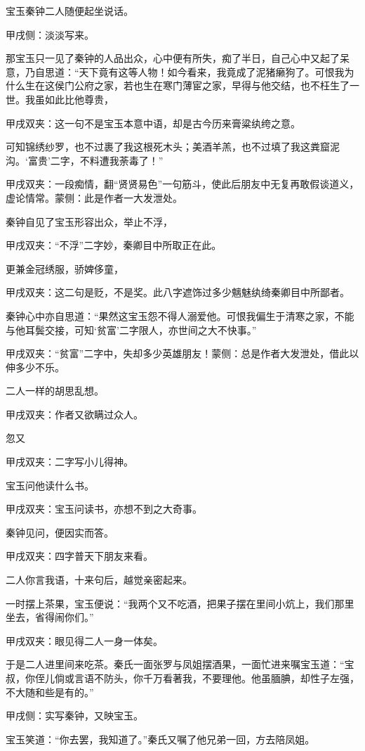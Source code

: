 \begin{parag}
    宝玉秦钟二人随便起坐说话。\begin{note}甲戌侧：淡淡写来。\end{note}那宝玉只一见了秦钟的人品出众，心中便有所失，痴了半日，自己心中又起了呆意，乃自思道：“天下竟有这等人物！如今看来，我竟成了泥猪癞狗了。可恨我为什么生在这侯门公府之家，若也生在寒门薄宦之家，早得与他交结，也不枉生了一世。我虽如此比他尊贵，\begin{note}甲戌双夹：这一句不是宝玉本意中语，却是古今历来膏粱纨绔之意。\end{note}可知锦绣纱罗，也不过裹了我这根死木头；美酒羊羔，也不过填了我这粪窟泥沟。‘富贵’二字，不料遭我荼毒了！”\begin{note}甲戌双夹：一段痴情，翻“贤贤易色”一句筋斗，使此后朋友中无复再敢假谈道义，虚论情常。蒙侧：此是作者一大发泄处。\end{note}秦钟自见了宝玉形容出众，举止不浮，\begin{note}甲戌双夹：“不浮”二字妙，秦卿目中所取正在此。\end{note}更兼金冠绣服，骄婢侈童，\begin{note}甲戌双夹：这二句是贬，不是奖。此八字遮饰过多少魑魅纨绮秦卿目中所鄙者。\end{note}秦钟心中亦自思道：“果然这宝玉怨不得人溺爱他。可恨我偏生于清寒之家，不能与他耳鬓交接，可知‘贫富’二字限人，亦世间之大不快事。”\begin{note}甲戌双夹：“贫富”二字中，失却多少英雄朋友！蒙侧：总是作者大发泄处，借此以伸多少不乐。\end{note}二人一样的胡思乱想。\begin{note}甲戌双夹：作者又欲瞒过众人。\end{note}忽又\begin{note}甲戌双夹：二字写小儿得神。\end{note}宝玉问他读什么书。\begin{note}甲戌双夹：宝玉问读书，亦想不到之大奇事。\end{note}秦钟见问，便因实而答。\begin{note}甲戌双夹：四字普天下朋友来看。\end{note}二人你言我语，十来句后，越觉亲密起来。
\end{parag}


\begin{parag}
    一时摆上茶果，宝玉便说：“我两个又不吃酒，把果子摆在里间小炕上，我们那里坐去，省得闹你们。”\begin{note}甲戌双夹：眼见得二人一身一体矣。\end{note}于是二人进里间来吃茶。秦氏一面张罗与凤姐摆酒果，一面忙进来嘱宝玉道：“宝叔，你侄儿倘或言语不防头，你千万看著我，不要理他。他虽腼腆，却性子左强，不大随和些是有的。”\begin{note}甲戌侧：实写秦钟，又映宝玉。\end{note}宝玉笑道：“你去罢，我知道了。”秦氏又嘱了他兄弟一回，方去陪凤姐。
\end{parag}


